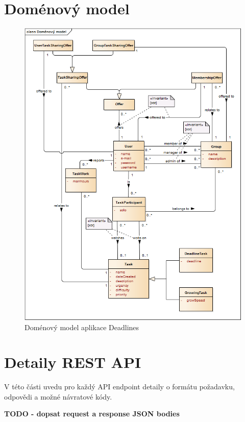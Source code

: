 \documentclass[thesis=B,czech]{FITthesis}[2012/06/26]
\begin{document}
\chapter{Doménový model}
	\begin{figure}\centering
		\includegraphics[width=1\textwidth]{ea-diagrams/domain-model.png}
		\caption[Doménový model]{Doménový model aplikace Deadlines}
		\label{diagram:domain-model}
	\end{figure}

\chapter{Detaily REST API}
	\label{appdx:restapi}
	V této části uvedu pro každý API endpoint detaily o formátu požadavku, odpovědi a možné návratové kódy.
	
	\textbf{TODO - dopsat request a response JSON bodies}
\end{document}
